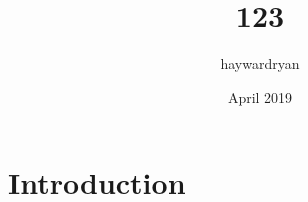 \documentclass{article}
\title{123}
\author{haywardryan }
\date{April 2019}
\begin{document}
\maketitle

\section{Introduction}
\end{document}
